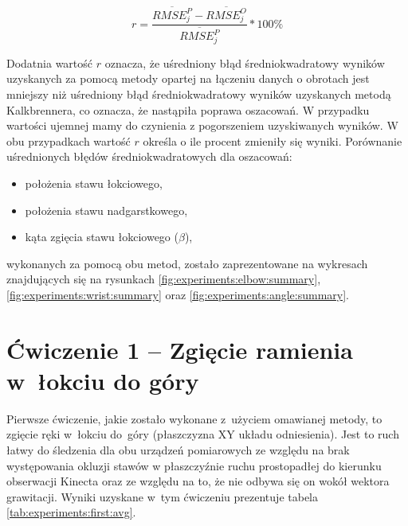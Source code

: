 \begin{equation}
	r = \frac{\overline{RMSE^P_j} - \overline{RMSE^O_j}}{\overline{RMSE^P_j}} * 100\%
	\label{eq:experiments:comparison}
\end{equation}
						
Dodatnia wartość $r$ oznacza, że uśredniony błąd średniokwadratowy wyników uzyskanych za pomocą metody opartej na łączeniu danych o obrotach jest mniejszy niż uśredniony błąd średniokwadratowy wyników uzyskanych metodą Kalkbrennera, co oznacza, że nastąpiła poprawa oszacowań. W przypadku wartości ujemnej mamy do czynienia z pogorszeniem uzyskiwanych wyników. W obu przypadkach wartość $r$ określa o ile procent zmieniły się wyniki. Porównanie uśrednionych błędów średniokwadratowych dla oszacowań:
\begin{itemize}
	\item położenia stawu łokciowego,
	\item położenia stawu nadgarstkowego,
	\item kąta zgięcia stawu łokciowego ($\beta$),
\end{itemize}
wykonanych za pomocą obu metod, zostało zaprezentowane na wykresach znajdujących się na rysunkach \ref{fig:experiments:elbow:summary}, \ref{fig:experiments:wrist:summary} oraz \ref{fig:experiments:angle:summary}.
						
\section*{Ćwiczenie 1 -- Zgięcie ramienia w~łokciu do góry}
Pierwsze ćwiczenie, jakie zostało wykonane z~użyciem omawianej metody, to zgięcie ręki w~łokciu do~góry (płaszczyzna XY układu odniesienia). Jest to ruch łatwy do śledzenia dla obu urządzeń pomiarowych ze względu na brak występowania okluzji stawów w płaszczyźnie ruchu prostopadłej do kierunku obserwacji Kinecta oraz ze względu na to, że nie odbywa się on wokół wektora grawitacji. Wyniki uzyskane w~tym ćwiczeniu prezentuje tabela \ref{tab:experiments:first:avg}.
						
